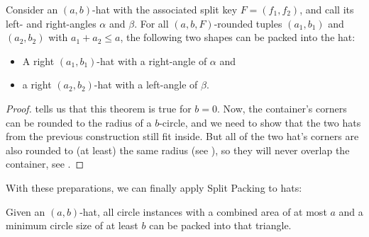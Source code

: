 \documentclass[a4paper,style=print,bibliography=totoc,nexus,lnum,extramargin]{tubsbook}
\begin{document}
\begin{lemma}\label{th:rounded-hats-in-hat}
    Consider an $(a,b)$-hat with the associated split key $F = (f_1, f_2)$, and call its left- and right-angles $\alpha$ and $\beta$.
    For all $(a,b,F)$-rounded tuples $(a_1, b_1)$ and $(a_2, b_2)$ with $a_1 + a_2 \le a$, the following two shapes can be packed into the hat:
    \begin{itemize}
        \item A right $(a_1,b_1)$-hat with a right-angle of $\alpha$ and
        \item a right $(a_2,b_2)$-hat with a left-angle of $\beta$.
    \end{itemize}
\end{lemma}

\begin{proof}
     tells us that this theorem is true for $b = 0$. Now, the container's corners can be rounded to the radius of a $b$-circle, and we need to show that the two hats from the previous construction still fit inside. But all of the two hat's corners are also rounded to (at least) the same radius (see ), so they will never overlap the container, see .
\end{proof}


With these preparations, we can finally apply Split Packing to hats:

\begin{theorem}\label{th:hats}
    Given an $(a,b)$-hat, all circle instances with a combined area of at most $a$ and a minimum circle size of at least $b$ can be packed into that triangle.
\end{theorem}
\end{document}
